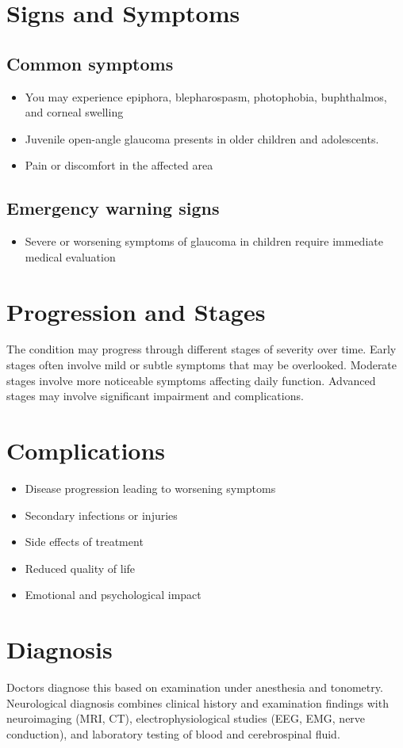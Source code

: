 \section{Signs and Symptoms}
\subsection{Common symptoms}
\begin{itemize}[noitemsep]
  \item You may experience epiphora, blepharospasm, photophobia, buphthalmos, and corneal swelling
  \item Juvenile open-angle glaucoma presents in older children and adolescents.
  \item Pain or discomfort in the affected area
  \end{itemize}
\subsection{Emergency warning signs}
\begin{itemize}[noitemsep]
  \item Severe or worsening symptoms of glaucoma in children require immediate medical evaluation
\end{itemize}
\section{Progression and Stages}
The condition may progress through different stages of severity over time. Early stages often involve mild or subtle symptoms that may be overlooked. Moderate stages involve more noticeable symptoms affecting daily function. Advanced stages may involve significant impairment and complications.
\section{Complications}
\begin{itemize}[noitemsep]
  \item Disease progression leading to worsening symptoms
  \item Secondary infections or injuries
  \item Side effects of treatment
  \item Reduced quality of life
  \item Emotional and psychological impact
\end{itemize}
\section{Diagnosis}
Doctors diagnose this based on examination under anesthesia and tonometry. Neurological diagnosis combines clinical history and examination findings with neuroimaging (MRI, CT), electrophysiological studies (EEG, EMG, nerve conduction), and laboratory testing of blood and cerebrospinal fluid.


